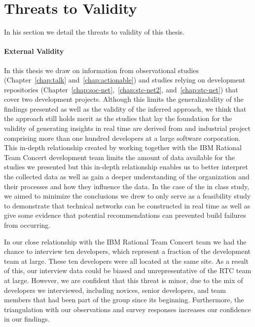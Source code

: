 \section{Threats to Validity}
\label{sec:threat}
In his section we detail the threats to validity of this thesis.

\paragraph{External Validity}
In this thesis we draw on information from observational studies (Chapter~\ref{chap:talk} and~\ref{chap:actionable}) and studies relying on development repositories (Chapter~\ref{chap:soc-net},~\ref{chap:stc-net2}, and~\ref{chap:stc-net}) that cover two development projects.
Although this limits the generalizability of the findings presented as well as the validity of the inferred approach, we think that the approach still holds merit as the studies that lay the foundation for the validity of generating insights in real time are derived from and industrial project comprising more than one hundred developers at a large software corporation.
This in-depth relationship created by working together with the IBM Rational Team Concert development team limits the amount of data available for the studies we presented but this in-depth relationship enables us to better interpret the collected data as well as gain a deeper understanding of the organization and their processes and how they influence the data.
In the case of the in class study, we aimed to minimize the conclusions we drew to only serve as a feasibility study to demonstrate that technical networks can be constructed in real time as well as give some evidence that potential recommendations can prevented build failures from occurring.

In our close relationship with the IBM Rational Team Concert team we had the chance to interview ten developers, which represent a fraction of the development team at large. These ten developers were all located at the same site. As a result of this, our interview data could be biased and unrepresentative of the RTC team at large.
However, we are confident that this threat is minor, due to the mix of developers we interviewed, including novices, senior developers, and team members that had been part of the group since its beginning.
Furthermore, the triangulation with our observations and survey responses increases our confidence in our findings.

